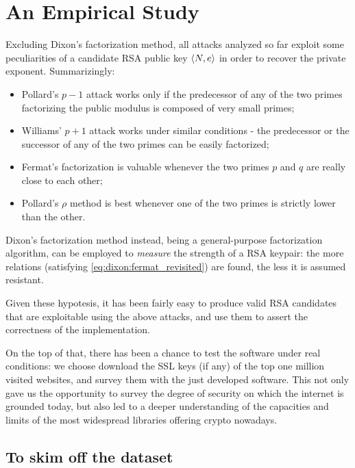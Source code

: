 \chapter{An Empirical Study}

Excluding Dixon's factorization method, all attacks analyzed so far exploit
some peculiarities of a candidate RSA public key $\langle N, e\rangle$ in order to
recover the private exponent.
Summarizingly:
\begin{itemize}
  \item Pollard's $p-1$ attack works only if the predecessor of any of
    the two primes factorizing the public modulus is composed of very small
    primes;
  \item  Williams' $p+1$ attack works under similar conditions - the predecessor
    or the successor of any of the two primes can be easily factorized;
  \item Fermat's factorization is valuable whenever the two primes $p$ and $q$
    are really close to each other;
  \item Pollard's $\rho$ method is best whenever one of the two primes is
    strictly lower than the other.
\end{itemize}
Dixon's factorization method instead, being a general-purpose factorization
algorithm, can be employed to \emph{measure} the strength of a RSA
keypair: the more relations (satisfying \ref{eq:dixon:fermat_revisited}) are
found, the less it is assumed resistant.

Given these hypotesis, it has been fairly easy to produce valid RSA candidates
that are exploitable using the above attacks, and use them to assert the
correctness of the implementation.

On the top of that, there has been a chance to test the software under real
conditions: we choose download the SSL keys (if any) of the top one million visited
websites, and survey them with the just developed software. This not only gave
us the opportunity to survey the degree of security on which the internet is
grounded today, but also led to a deeper understanding of the capacities and limits of
the most widespread libraries offering crypto nowadays.

\vfill
\section{To skim off the dataset}

